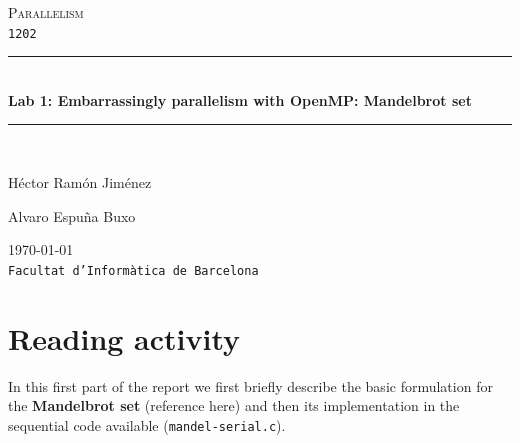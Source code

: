\documentclass[a4paper,11pt]{article}
\begin{document}
\begin{titlepage}
\begin{center}
\textsc{\Large Parallelism}
\\
\texttt{1202}
\\[1.5cm]
\rule{\linewidth}{0.5mm}
\\[0.4cm]
{\huge
\bfseries
Lab 1: Embarrassingly parallelism with OpenMP: Mandelbrot set
\\[0.4cm]
}
\rule{\linewidth}{0.5mm}
\\[2.5cm]
\begin{minipage}{0.4\textwidth}
\begin{flushleft}
\large
Héctor Ramón Jiménez
\end{flushleft}
\end{minipage}
\begin{minipage}{0.4\textwidth}
\begin{flushright}
\large
Alvaro Espuña Buxo
\end{flushright}
\end{minipage}
\vfill
{\large
\today
}
\\
{\large
\texttt{Facultat d'Informàtica de Barcelona}
}
\end{center}
\end{titlepage}
\section{Reading activity}
In this first part of the report we first briefly describe the basic formulation for the \textbf{Mandelbrot set}
    (reference here) and then its implementation in the sequential code available (\texttt{mandel-serial.c}).
\end{document}
